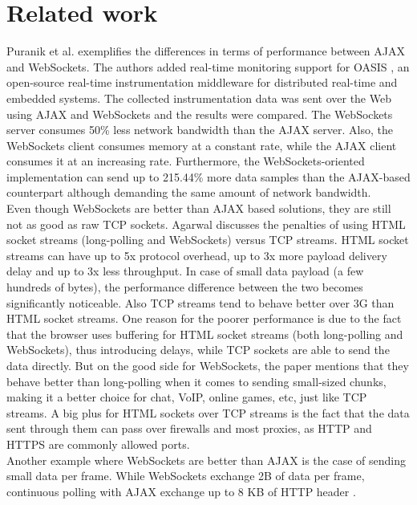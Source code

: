 \documentclass[conference]{IEEEtran}
\begin{document}
\section{Related work}
Puranik et al. \cite{RT-Monitoring} exemplifies the differences in terms of
performance between AJAX and WebSockets. The authors added real-time monitoring
support for OASIS \cite{OASIS}, an open-source real-time instrumentation
middleware for distributed real-time and embedded systems. The collected
instrumentation data was sent over the Web using AJAX and WebSockets and the
results were compared. The WebSockets server consumes 50\% less network
bandwidth than the AJAX server. Also, the WebSockets client consumes memory at
a constant rate, while the AJAX client consumes it at an increasing rate.
Furthermore, the WebSockets-oriented implementation can send up to 215.44\%
more data samples than the AJAX-based counterpart although demanding the same
amount of network bandwidth.
\\

Even though WebSockets are better than AJAX based solutions, they are still
not as good as raw TCP sockets. Agarwal \cite{Performance-Penalty} discusses
the penalties of using HTML socket streams (long-polling and WebSockets) versus
TCP streams. HTML socket streams can have up to 5x protocol overhead, up to
3x more payload delivery delay and up to 3x less throughput. In case of small
data payload (a few hundreds of bytes), the performance difference between the
two becomes significantly noticeable. Also TCP streams tend to behave better
over 3G than HTML socket streams.
One reason for the poorer performance is due to the fact that the browser uses
buffering for HTML socket streams (both long-polling and WebSockets), thus 
introducing delays, while TCP sockets are able to send the data directly.
But on the good side for
WebSockets, the paper mentions that they behave better than long-polling when
it comes to sending small-sized chunks, making it a better choice for chat,
VoIP, online games, etc, just like TCP streams. A big plus for HTML sockets
over TCP streams is the fact that the data sent through them can pass over
firewalls and most proxies, as HTTP and HTTPS are commonly allowed ports.
\\

Another example where WebSockets are better than AJAX is the case of sending
small data per frame. While WebSockets exchange 2B of data per frame, continuous
polling with AJAX exchange up to 8 KB of HTTP header \cite{2009:Misc}.
\\
\end{document}

